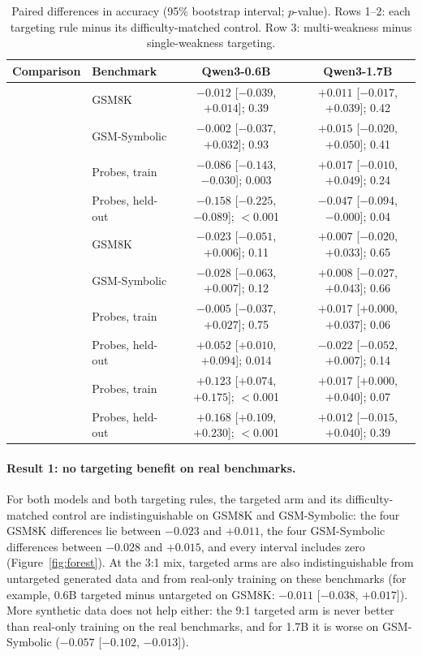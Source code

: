 \documentclass[11pt]{article}
\begin{document}
\begin{table}[t]
\centering
\caption{Paired differences in accuracy (95\% bootstrap interval; $p$-value). Rows 1--2: each targeting rule minus
its difficulty-matched control. Row 3: multi-weakness minus single-weakness targeting.}
\label{tab:primary}
\small
\begin{tabular}{llcc}
\toprule
Comparison & Benchmark & Qwen3-0.6B & Qwen3-1.7B \\
\midrule
{}
& GSM8K            & $-0.012$ [$-0.039$, $+0.014$]; 0.39 & $+0.011$ [$-0.017$, $+0.039$]; 0.42 \\
& GSM-Symbolic     & $-0.002$ [$-0.037$, $+0.032$]; 0.93 & $+0.015$ [$-0.020$, $+0.050$]; 0.41 \\
& Probes, train    & $-0.086$ [$-0.143$, $-0.030$]; 0.003 & $+0.017$ [$-0.010$, $+0.049$]; 0.24 \\
& Probes, held-out & $-0.158$ [$-0.225$, $-0.089$]; $<$0.001 & $-0.047$ [$-0.094$, $-0.000$]; 0.04 \\
\midrule
{}
& GSM8K            & $-0.023$ [$-0.051$, $+0.006$]; 0.11 & $+0.007$ [$-0.020$, $+0.033$]; 0.65 \\
& GSM-Symbolic     & $-0.028$ [$-0.063$, $+0.007$]; 0.12 & $+0.008$ [$-0.027$, $+0.043$]; 0.66 \\
& Probes, train    & $-0.005$ [$-0.037$, $+0.027$]; 0.75 & $+0.017$ [$+0.000$, $+0.037$]; 0.06 \\
& Probes, held-out & $+0.052$ [$+0.010$, $+0.094$]; 0.014 & $-0.022$ [$-0.052$, $+0.007$]; 0.14 \\
\midrule
{}
& Probes, train    & $+0.123$ [$+0.074$, $+0.175$]; $<$0.001 & $+0.017$ [$+0.000$, $+0.040$]; 0.07 \\
& Probes, held-out & $+0.168$ [$+0.109$, $+0.230$]; $<$0.001 & $+0.012$ [$-0.015$, $+0.040$]; 0.39 \\
\bottomrule
\end{tabular}
\end{table}

\paragraph{Result 1: no targeting benefit on real benchmarks.} For both models and both targeting rules, the targeted
arm and its difficulty-matched control are indistinguishable on GSM8K and GSM-Symbolic: the four GSM8K differences lie
between $-0.023$ and $+0.011$, the four GSM-Symbolic differences between $-0.028$ and $+0.015$, and every interval
includes zero (Figure~\ref{fig:forest}). At the 3:1 mix, targeted arms are also indistinguishable from untargeted
generated data and from real-only training on these benchmarks (for example, 0.6B targeted minus untargeted on GSM8K:
$-0.011$ [$-0.038$, $+0.017$]). More synthetic data does not help either: the 9:1 targeted arm is never better than
real-only training on the real benchmarks, and for 1.7B it is worse on GSM-Symbolic ($-0.057$ [$-0.102$, $-0.013$]).
\end{document}
